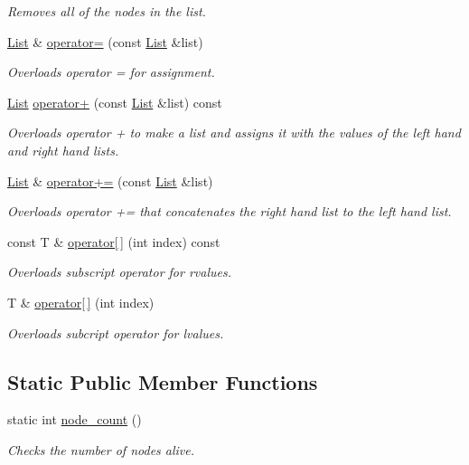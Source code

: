 \begin{DoxyCompactItemize}
\begin{DoxyCompactList}\small\item\em Removes all of the nodes in the list. \end{DoxyCompactList}\item 
\hyperlink{class_c_s170_1_1_list}{List} \& \hyperlink{class_c_s170_1_1_list_abfc9fde7b86f5b234ea75c8652c8abbe}{operator=} (const \hyperlink{class_c_s170_1_1_list}{List} \&list)
\begin{DoxyCompactList}\small\item\em Overloads operator = for assignment. \end{DoxyCompactList}\item 
\hyperlink{class_c_s170_1_1_list}{List} \hyperlink{class_c_s170_1_1_list_aa70b894161e3db320ec80f39eb762503}{operator+} (const \hyperlink{class_c_s170_1_1_list}{List} \&list) const 
\begin{DoxyCompactList}\small\item\em Overloads operator + to make a list and assigns it with the values of the left hand and right hand lists. \end{DoxyCompactList}\item 
\hyperlink{class_c_s170_1_1_list}{List} \& \hyperlink{class_c_s170_1_1_list_a556309385bee40d175c4d9ded4ec19ff}{operator+=} (const \hyperlink{class_c_s170_1_1_list}{List} \&list)
\begin{DoxyCompactList}\small\item\em Overloads operator += that concatenates the right hand list to the left hand list. \end{DoxyCompactList}\item 
const T \& \hyperlink{class_c_s170_1_1_list_aad16c5bfe582bfd9ef802603d21caf9f}{operator\mbox{[}$\,$\mbox{]}} (int index) const 
\begin{DoxyCompactList}\small\item\em Overloads subscript operator for rvalues. \end{DoxyCompactList}\item 
T \& \hyperlink{class_c_s170_1_1_list_a949b9a73a93b1ffee902dd18feefd276}{operator\mbox{[}$\,$\mbox{]}} (int index)
\begin{DoxyCompactList}\small\item\em Overloads subcript operator for lvalues. \end{DoxyCompactList}\end{DoxyCompactItemize}
\subsection*{Static Public Member Functions}
\begin{DoxyCompactItemize}
\item 
static int \hyperlink{class_c_s170_1_1_list_a793b51702740d8638d591f5b83a47b49}{node\-\_\-count} ()
\begin{DoxyCompactList}\small\item\em Checks the number of nodes alive. \end{DoxyCompactList}\end{DoxyCompactItemize}
